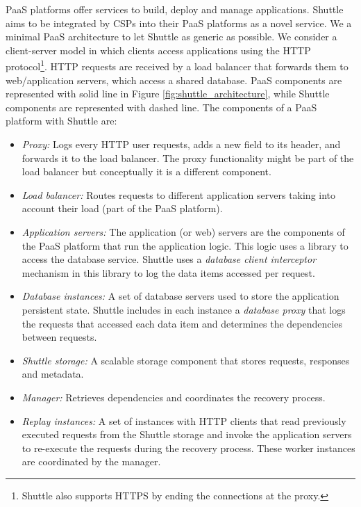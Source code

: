 \documentclass[10pt,conference]{IEEEtran}
\begin{document}
\ac{PaaS} platforms offer services to build, deploy and manage applications. Shuttle aims to be integrated by CSPs into their \ac{PaaS} platforms as a novel service. 
We \DIFdelbegin {}\DIFdelend \DIFaddbegin {}\DIFaddend a minimal \ac{PaaS} architecture to let Shuttle as generic as possible. We consider a client-server model in which clients access applications using the HTTP protocol\footnote{Shuttle also supports HTTPS by ending the connections at the proxy.}. HTTP requests are received by a load balancer that forwards them to web/application servers, which access a shared database. {PaaS} components are represented with solid line in Figure \ref{fig:shuttle_architecture}, while Shuttle components are represented with dashed line. The components of a \ac{PaaS} platform with Shuttle are:

\begin{itemize}
  \item \textit{Proxy:} Logs every HTTP user requests, adds a new field to its header, and forwards it to the load balancer. The proxy functionality might be part of the load balancer but conceptually it is a different component.  \item \textit{Load balancer:} Routes requests to different application servers taking into account their load (part of the \ac{PaaS} platform).
  \item \textit{Application servers:} The application (or web) servers are the components of the \ac{PaaS} platform that run the application logic. This logic uses a library to access the database service. Shuttle uses a \textit{database client interceptor} mechanism in this library to log the data items accessed per request.
  \item \textit{Database instances:} A set of database servers used to store the application persistent state. Shuttle includes in each instance  a \textit{database proxy} that logs the requests that accessed each data item and determines the dependencies between requests.
  \item \textit{Shuttle storage:} A scalable storage component that stores requests, responses and metadata.
  \item \textit{Manager:} Retrieves dependencies and coordinates the recovery process. 
  \item \textit{Replay instances:} A set of instances with HTTP clients that read previously executed requests from the Shuttle storage and invoke the application servers to re-execute the requests during the recovery process. These worker instances are coordinated by the manager.
\end{itemize}
\end{document}
